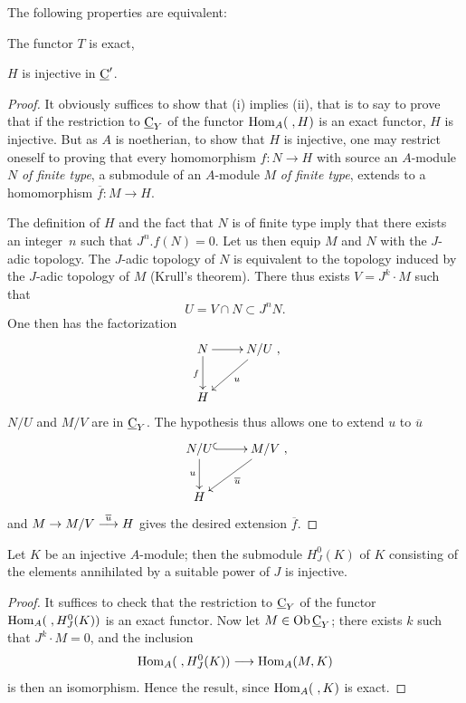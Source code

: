 \begin{proposition} \label{IV.2.1}
The following properties are equivalent:
\begin{enumeratei}
\item
The functor $T$ is exact,

\item
$H$ is injective in $\underline{\mathrm{C}}'$.
\end{enumeratei}
\end{proposition}

\begin{proof}
It obviously suffices to show that (i) implies (ii), that is to say to prove that if the restriction to $\underline{\mathrm{C}}_{Y}$ of the functor $\operatorname{Hom}_{A}(\;, H)$ is an exact functor, $H$ is injective. But as $A$ is noetherian, to show that $H$ is injective, one may restrict oneself to proving that every homomorphism $f:N\to H$ with source an $A$-module $N$ \emph{of finite type}, a submodule of an $A$-module $M$ \emph{of finite type}, extends to a homomorphism $\overline{f}:M\to H$.

The definition of $H$ and the fact that $N$ is of finite type imply that there exists an integer~$n$ such that $J^{n}.f(N)=0$. Let us then equip $M$ and $N$ with the $J$-adic topology. The $J$-adic topology of $N$ is equivalent to the topology induced by the $J$-adic topology of $M$ (Krull's theorem). There thus exists $V=J^{k}\cdot M$ such that
\begin{equation*} U=V\cap N\subset J^{n}N.
\end{equation*}
One then has the factorization
$$
\xymatrix{ N\ar_{f}[d]\ar[r]&N/U\ar^{u}[dl]\\
H&},
$$
$N/U$ and $M/V$ are in $\underline{\mathrm{C}}_{Y}$. The hypothesis thus allows one to extend $u$ to $\overline{u}$
$$
\xymatrix{ N/U\ar_{u}[d]\ar@{^{(}->}[r]&M/V\ar^{\overline{u}}[dl]\\
H&},
$$
and $M\to M/V\lto{\overline{u}} H$ gives the desired extension $\overline{f}$.
\skipqed
\end{proof}

\begin{corollary} \label{IV.2.2}
Let $K$ be an injective $A$-module; then the submodule $H^{0}_{J}(K)$ of $K$ consisting of the elements annihilated by a suitable power of $J$ is injective.
\end{corollary}

\begin{proof}
It suffices to check that the restriction to $\underline{\mathrm{C}}_{Y}$ of the functor $ \operatorname{Hom}_{A}(\;, H^{0}_{J}(K))$ is an exact functor. Now let $M\in \operatorname{Ob} \underline{\mathrm{C}}_{Y}$; there exists $k$ such that $J^{k}\cdot M=0$, and the inclusion
$$
\Hom_{A}(\;, H^{0}_{J}(K))\to \Hom_{A}(M, K)
$$
is then an isomorphism. Hence the result, since $\operatorname{Hom}_{A}(\;, K)$ is exact.
\skipqed
\end{proof}

